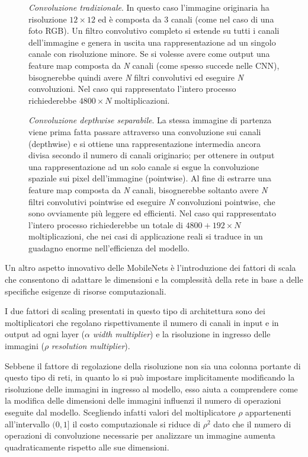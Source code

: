 \begin{figure}[ht!]
    \centering
    \caption{\textit{Convoluzione tradizionale}. In questo caso l'immagine originaria ha risoluzione $12\times12$ ed è composta da 3 canali (come nel caso di una foto RGB). Un filtro convolutivo completo si estende su tutti i canali dell'immagine e genera in uscita una rappresentazione ad un singolo canale con risoluzione minore. Se si volesse avere come output una feature map composta da \textit{N} canali (come spesso succede nelle CNN), bisognerebbe quindi avere \textit{N} filtri convolutivi ed eseguire \textit{N} convoluzioni. Nel caso qui rappresentato l'intero processo richiederebbe $4800\times N$ moltiplicazioni.}
\end{figure}

\begin{figure}[ht!]
    \centering
    \caption{\textit{Convoluzione depthwise separabile}. La stessa immagine di partenza viene prima fatta passare attraverso una convoluzione sui canali (depthwise) e si ottiene una rappresentazione intermedia ancora divisa secondo il numero di canali originario; per ottenere in output una rappresentazione ad un solo canale si esgue la convoluzione spaziale sui pixel dell'immagine (pointwise). Al fine di estrarre una feature map composta da \textit{N} canali, bisognerebbe soltanto avere \textit{N} filtri convolutivi pointwise ed eseguire \textit{N} convoluzioni pointwise, che sono ovviamente più leggere ed efficienti. Nel caso qui rappresentato l'intero processo richiederebbe un totale di $4800 + 192\times N$ moltiplicazioni, che nei casi di applicazione reali si traduce in un guadagno enorme nell'efficienza del modello.}
\end{figure}

Un altro aspetto innovativo delle MobileNets è l'introduzione dei fattori di scala che consentono di adattare le dimensioni e la complessità della rete in base a delle specifiche esigenze di risorse computazionali. 

I due fattori di scaling presentati in questo tipo di architettura sono dei moltiplicatori che regolano rispettivamente il numero di canali in input e in output ad ogni layer ($\alpha$  \textit{width multiplier}) e la risoluzione in ingresso delle immagini ($\rho$  \textit{resolution multiplier}).

Sebbene il fattore di regolazione della risoluzione non sia una colonna portante di questo tipo di reti, in quanto lo si può impostare implicitamente modificando la risoluzione delle immagini in ingresso al modello, esso aiuta a comprendere come la modifica delle dimensioni delle immagini influenzi il numero di operazioni eseguite dal modello. Scegliendo infatti valori del moltiplicatore $\rho$ appartenenti all'intervallo $(0, 1]$ il  costo computazionale si riduce di $\rho^{2}$ dato che il numero di operazioni di convoluzione necessarie per analizzare un immagine aumenta quadraticamente rispetto alle sue dimensioni.

